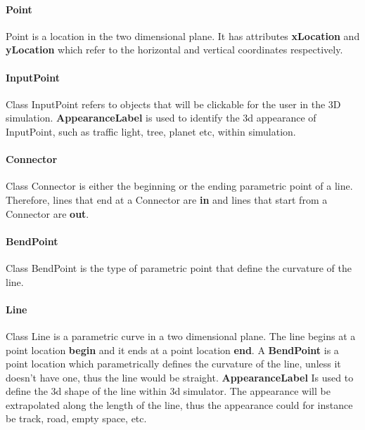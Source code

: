 \paragraph{Point}
Point is a location in the two dimensional plane. It has attributes \textbf{xLocation} and \textbf{yLocation} which refer to the horizontal and vertical coordinates respectively.

\paragraph{InputPoint}
Class InputPoint refers to objects that will be clickable for the user in the 3D simulation. \textbf{AppearanceLabel} is used to identify the 3d appearance of InputPoint, such as traffic light, tree, planet etc, within simulation.

\paragraph{Connector}
Class Connector is either the beginning or the ending parametric point of a line. Therefore, lines that end at a Connector are \textbf{in} and lines that start from a Connector are \textbf{out}.

\paragraph{BendPoint}
Class BendPoint is the type of parametric point that define the curvature of the line.

\paragraph{Line}
Class Line is a parametric curve in a two dimensional plane. The line begins at a point location \textbf{begin} and it ends at a point location \textbf{end}. A \textbf{BendPoint} is a point location which parametrically defines the curvature of the line, unless it doesn't have one, thus the line would be straight. \textbf{AppearanceLabel} Is used to define the 3d shape of the line within 3d simulator. The appearance will be extrapolated along the length of the line, thus the appearance could for instance be track, road, empty space, etc.
